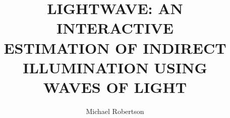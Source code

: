 \documentclass[12pt]{report}
\author{Michael Robertson}
\title{
LIGHTWAVE: AN INTERACTIVE \\
ESTIMATION OF INDIRECT \\
ILLUMINATION USING \\
WAVES OF LIGHT}
\begin{document}

\maketitle

\raggedright



\tableofcontents



\listoftables


\listoffigures

%

%


\raggedright
\startbody








%

\renewcommand{\bibname}{\normalfont BIBLIOGRAPHY}


%
%
\end{document}
